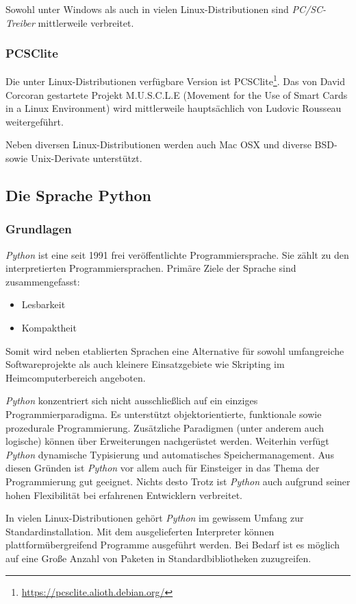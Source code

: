 Sowohl unter Windows als auch in vielen Linux-Distributionen sind
\textit{PC/SC-Treiber} mittlerweile verbreitet.

\subsubsection{PCSClite}
Die unter Linux-Distributionen verfügbare Version ist
PCSClite\footnote{\url{https://pcsclite.alioth.debian.org/}}.
Das von David Corcoran gestartete Projekt M.U.S.C.L.E
(Movement for the Use of Smart Cards in a Linux Environment)
wird mittlerweile hauptsächlich von Ludovic Rousseau
weitergeführt\cite{pcscliteweb}.

Neben diversen Linux-Distributionen werden auch Mac OSX und diverse
BSD- sowie Unix-Derivate unterstützt.

\subsection{Die Sprache Python}
\subsubsection{Grundlagen}
\textit{Python} ist eine seit 1991 frei veröffentlichte Programmiersprache. Sie zählt
zu den interpretierten Programmiersprachen. Primäre Ziele der Sprache sind zusammengefasst:
\begin{itemize}
\item Lesbarkeit
\item Kompaktheit
\end{itemize}
Somit wird neben etablierten Sprachen eine Alternative für sowohl umfangreiche Softwareprojekte
als auch kleinere Einsatzgebiete wie Skripting im Heimcomputerbereich angeboten.

\textit{Python} konzentriert sich nicht ausschließlich auf ein einziges Programmierparadigma.
Es unterstützt objektorientierte, funktionale sowie prozedurale Programmierung. Zusätzliche
Paradigmen (unter anderem auch logische) können über Erweiterungen nachgerüstet werden.
Weiterhin verfügt \textit{Python} dynamische Typisierung und automatisches Speichermanagement. Aus
diesen Gründen ist \textit{Python} vor allem auch für Einsteiger in das Thema der Programmierung
gut geeignet. Nichts desto Trotz ist \textit{Python} auch aufgrund seiner hohen Flexibilität
bei erfahrenen Entwicklern verbreitet.

In vielen Linux-Distributionen gehört \textit{Python} im gewissem Umfang zur Standardinstallation.
Mit dem ausgelieferten Interpreter können plattformübergreifend Programme ausgeführt werden. Bei
Bedarf ist es möglich auf eine Große Anzahl von Paketen in Standardbibliotheken zuzugreifen.


